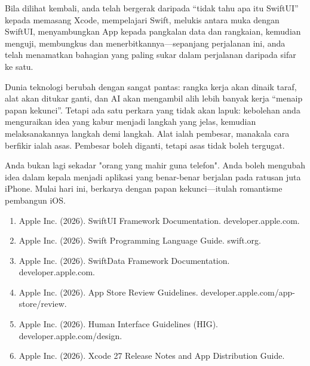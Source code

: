 
Bila dilihat kembali, anda telah bergerak daripada “tidak tahu apa itu SwiftUI” kepada memasang Xcode, mempelajari Swift, melukis antara muka dengan SwiftUI, menyambungkan App kepada pangkalan data dan rangkaian, kemudian menguji, membungkus dan menerbitkannya—sepanjang perjalanan ini, anda telah menamatkan bahagian yang paling sukar dalam perjalanan daripada sifar ke satu.

Dunia teknologi berubah dengan sangat pantas: rangka kerja akan dinaik taraf, alat akan ditukar ganti, dan AI akan mengambil alih lebih banyak kerja “menaip papan kekunci”. Tetapi ada satu perkara yang tidak akan lapuk: kebolehan anda menguraikan idea yang kabur menjadi langkah yang jelas, kemudian melaksanakannya langkah demi langkah. Alat ialah pembesar, manakala cara berfikir ialah asas. Pembesar boleh diganti, tetapi asas tidak boleh tergugat.

Anda bukan lagi sekadar "orang yang mahir guna telefon". Anda boleh mengubah idea dalam kepala menjadi aplikasi yang benar-benar berjalan pada ratusan juta iPhone. Mulai hari ini, berkarya dengan papan kekunci—itulah romantisme pembangun iOS.


\begin{enumerate}
  \item Apple Inc. (2026). SwiftUI Framework Documentation. developer.apple.com.
  \item Apple Inc. (2026). Swift Programming Language Guide. swift.org.
  \item Apple Inc. (2026). SwiftData Framework Documentation. developer.apple.com.
  \item Apple Inc. (2026). App Store Review Guidelines. developer.apple.com/app-store/review.
  \item Apple Inc. (2026). Human Interface Guidelines (HIG). developer.apple.com/design.
  \item Apple Inc. (2026). Xcode 27 Release Notes and App Distribution Guide.
\end{enumerate}
